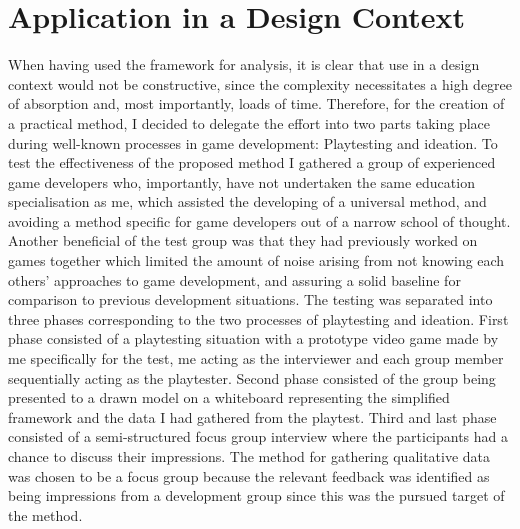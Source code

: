 \section{Application in a Design Context}
When having used the framework for analysis, it is clear that use in a design context would not be constructive, since the complexity necessitates a high degree of absorption and, most importantly, loads of time. Therefore, for the creation of a practical method, I decided to delegate the effort into two parts taking place during well-known processes in game development: Playtesting and ideation. To test the effectiveness of the proposed method I gathered a group of experienced game developers who, importantly, have not undertaken the same education specialisation as me, which assisted the developing of a universal method, and avoiding a method specific for game developers out of a narrow school of thought. Another beneficial of the test group was that they had previously worked on games together which limited the amount of noise arising from not knowing each others' approaches to game development, and assuring a solid baseline for comparison to previous development situations. The testing was separated into three phases corresponding to the two processes of playtesting and ideation. First phase consisted of a playtesting situation with a prototype video game made by me specifically for the test, me acting as the interviewer and each group member sequentially acting as the playtester. Second phase consisted of the group being presented to a drawn model on a whiteboard representing the simplified framework and the data I had gathered from the playtest. Third and last phase consisted of a semi-structured focus group interview \cite{cresswell} where the participants had a chance to discuss their impressions. The method for gathering qualitative data was chosen to be a focus group because the relevant feedback was identified as being impressions from a development group since this was the pursued target of the method.

